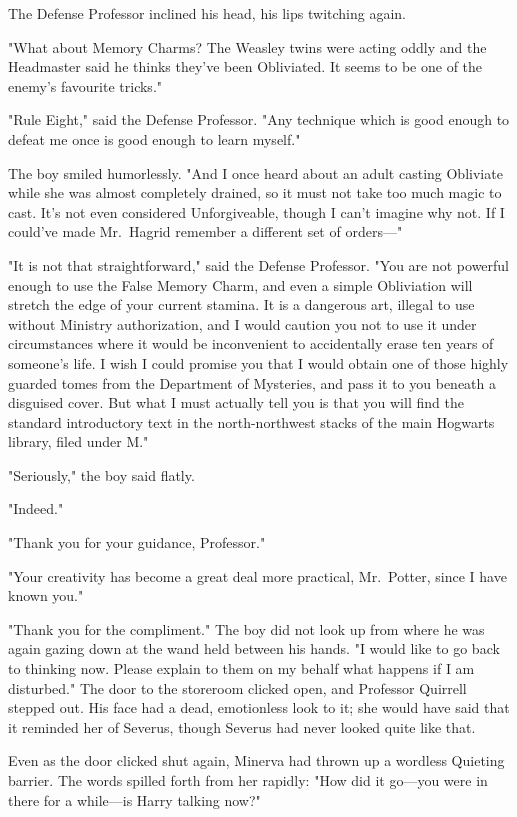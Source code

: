 The Defense Professor inclined his head, his lips twitching again.

"What about Memory Charms? The Weasley twins were acting oddly and the
Headmaster said he thinks they've been Obliviated. It seems to be one of the
enemy's favourite tricks."

"Rule Eight," said the Defense Professor. "Any technique which is good enough
to defeat me once is good enough to learn myself."

The boy smiled humorlessly. "And I once heard about an adult casting Obliviate
while she was almost completely drained, so it must not take too much magic to
cast. It's not even considered Unforgiveable, though I can't imagine why not.
If I could've made Mr.~Hagrid remember a different set of orders---"

"It is not that straightforward," said the Defense Professor. "You are not
powerful enough to use the False Memory Charm, and even a simple Obliviation
will stretch the edge of your current stamina. It is a dangerous art, illegal
to use without Ministry authorization, and I would caution you not to use it
under circumstances where it would be inconvenient to accidentally erase ten
years of someone's life. I wish I could promise you that I would obtain one of
those highly guarded tomes from the Department of Mysteries, and pass it to you
beneath a disguised cover. But what I must actually tell you is that you will
find the standard introductory text in the north-northwest stacks of the main
Hogwarts library, filed under M."

"Seriously," the boy said flatly.

"Indeed."

"Thank you for your guidance, Professor."

"Your creativity has become a great deal more practical, Mr.~Potter, since I
have known you."

"Thank you for the compliment." The boy did not look up from where he was again
gazing down at the wand held between his hands. "I would like to go back to
thinking now. Please explain to them on my behalf what happens if I am
disturbed."
\later
The door to the storeroom clicked open, and Professor Quirrell stepped out. His
face had a dead, emotionless look to it; she would have said that it reminded
her of Severus, though Severus had never looked quite like that.

Even as the door clicked shut again, Minerva had thrown up a wordless Quieting
barrier. The words spilled forth from her rapidly: "How did it go---you were in
there for a while---is Harry talking now?"

